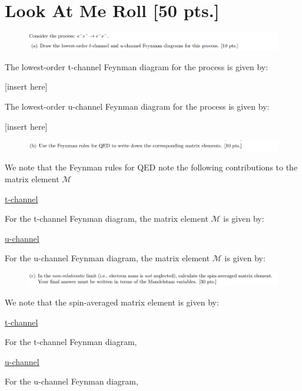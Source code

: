 \documentclass[11pt]{article}
\theoremstyle{definition}
\numberwithin{equation}{section}
\begin{document}
\newpage


\section{\textbf{Look At Me Roll} [50 pts.]}


\begin{figure}[H]
    \centering
    \includegraphics[scale = 0.4]{2a.png}
\end{figure}

The lowest-order t-channel Feynman diagram for the process is given by:

[insert here]

The lowest-order u-channel Feynman diagram for the process is given by:

[insert here]

\newpage



\begin{figure}[H]
    \centering
    \includegraphics[scale = 0.4]{2b.png}
\end{figure}

We note that the Feynman rules for QED note the following contributions to the matrix element $\mathcal{M}$

\underline{t-channel}

For the t-channel Feynman diagram, the matrix element $\mathcal{M}$ is given by:

\underline{u-channel}

For the u-channel Feynman diagram, the matrix element $\mathcal{M}$ is given by:
\newpage


\begin{figure}[H]
    \centering
    \includegraphics[scale = 0.4]{2c.png}
\end{figure}

We note that the spin-averaged matrix element is given by:

\underline{t-channel}

For the t-channel Feynman diagram, 

\underline{u-channel}

For the u-channel Feynman diagram,
\end{document}

